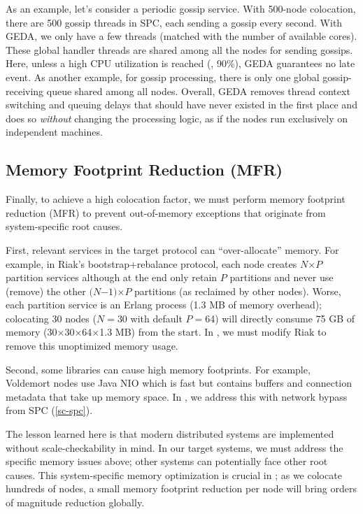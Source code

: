 As an example, let's consider a periodic gossip service.  With 500-node
colocation, there are 500 gossip threads in SPC, each sending a gossip
every second.  With GEDA, we only have a few threads (matched with the
number of available cores).  These global handler threads are shared
among all the nodes for sending gossips.  Here, unless a high CPU
utilization is reached (\eg, 90\%), GEDA guarantees no late event.  As
another example, for gossip processing, there is only one global
gossip-receiving queue shared among all nodes.
%
Overall, GEDA removes thread context switching and queuing delays that
should have never existed in the first place and does so {\em without}
changing the processing logic, as if the nodes run exclusively on
independent machines.







\subsection{Memory Footprint Reduction (MFR)}
\label{sc-mem}


Finally, to achieve a high colocation factor, we must perform memory
footprint reduction (MFR) to prevent out-of-memory exceptions that 
originate from system-specific root causes.

First, relevant services in the target protocol can
``over-allocate'' memory.
%
For example, in Riak's bootstrap+rebalance protocol, each node
creates $N$$\times$$P$ partition services although at the end only retain
$P$ partitions and never use (remove) the other $(N$$-$$1)$$\times$$P$
partitions (as reclaimed by other nodes).
%
Worse, each partition service is an Erlang process (1.3 MB of memory
overhead); colocating 30 nodes ($N$$=$30 with default $P$$=$64) will
directly consume 75 GB of memory (30$\times$30$\times$64$\times$1.3 MB)
from the start.
%
In \sck, we must modify Riak to remove this unoptimized memory usage.

Second, some libraries can cause high memory footprints.  For example,
Voldemort nodes use Java NIO \cite{VoldemortNIO} 
which is fast but contains buffers
and connection metadata that take up memory space.  In \sck, we address
this with network bypass from SPC (\sec\ref{sc-spc}).

The lesson learned here is that modern distributed systems are implemented
without scale-checkability in mind.  In our target systems, we must
address the specific memory issues above; other systems can
potentially face other root causes.  This system-specific memory
optimization is crucial in \sck; as we colocate hundreds of nodes, a small
memory footprint reduction per node will bring orders of magnitude
reduction globally.


